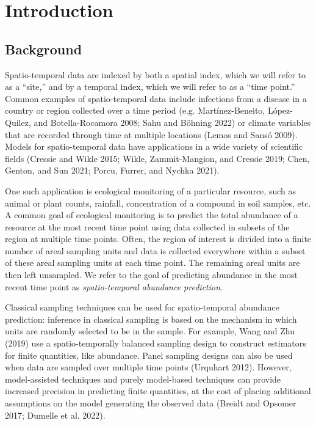 \documentclass[smallextended]{svjour3}       %
\begin{document}
\hypertarget{intro}{%
\section{Introduction}\label{intro}}

\hypertarget{background}{%
\subsection{Background}\label{background}}

Spatio-temporal data are indexed by both a spatial index, which we will
refer to as a ``site,'' and by a temporal index, which we will refer to
as a ``time point.'' Common examples of spatio-temporal data include
infections from a disease in a country or region collected over a time
period (e.g. Martínez-Beneito, López-Quilez, and Botella-Rocamora 2008;
Sahu and Böhning 2022) or climate variables that are recorded through
time at multiple locations (Lemos and Sansó 2009). Models for
spatio-temporal data have applications in a wide variety of scientific
fields (Cressie and Wikle 2015; Wikle, Zammit-Mangion, and Cressie 2019;
Chen, Genton, and Sun 2021; Porcu, Furrer, and Nychka 2021).

One such application is ecological monitoring of a particular resource,
such as animal or plant counts, rainfall, concentration of a compound in
soil samples, etc. A common goal of ecological monitoring is to predict
the total abundance of a resource at the most recent time point using
data collected in subsets of the region at multiple time points. Often,
the region of interest is divided into a finite number of areal sampling
units and data is collected everywhere within a subset of these areal
sampling units at each time point. The remaining areal units are then
left unsampled. We refer to the goal of predicting abundance in the most
recent time point as \emph{spatio-temporal abundance prediction}.

Classical sampling techniques can be used for spatio-temporal abundance
prediction: inference in classical sampling is based on the mechanism in
which units are randomly selected to be in the sample. For example, Wang
and Zhu (2019) use a spatio-temporally balanced sampling design to
construct estimators for finite quantities, like abundance. Panel
sampling designs can also be used when data are sampled over multiple
time points (Urquhart 2012). However, model-assisted techniques and
purely model-based techniques can provide increased precision in
predicting finite quantities, at the cost of placing additional
assumptions on the model generating the observed data (Breidt and
Opsomer 2017; Dumelle et al. 2022).
\end{document}
